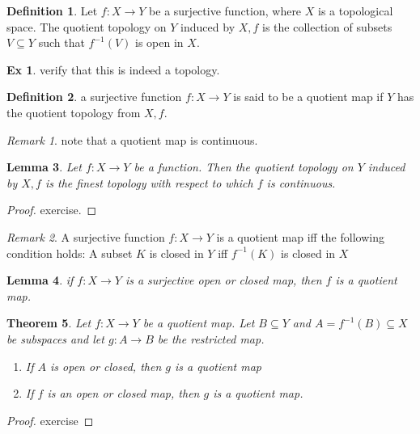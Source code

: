 \documentclass[10pt, openany]{book}
\theoremstyle{plain}
\newtheorem{theorem}{Theorem}[section]
\newtheorem{lemma}[theorem]{Lemma}
\theoremstyle{definition}
\newtheorem{definition}[theorem]{Definition}
\newtheorem{exercise}{Ex}[section]
\theoremstyle{remark}
\newtheorem{remark}{Remark}
\begin{document}
\begin{definition}
  Let $f:X\rightarrow Y$ be a surjective function, where $X$ is a topological space. The quotient topology on $Y$ induced by $X,f$ is the collection of subsets $V\subseteq Y$ such that $f^{-1}(V)$ is open in $X$.
\end{definition}
\begin{exercise}
    verify that this is indeed a topology.
\end{exercise}
\begin{definition}
    a surjective function $f: X\rightarrow Y$ is said to be a quotient map if $Y$ has the quotient topology from $X,f$.
\end{definition}
\begin{remark}
    note that a quotient map is continuous.
\end{remark}

\begin{lemma}
    Let $f:X\rightarrow Y$ be a function. Then the quotient topology on $Y$ induced by $X,f$ is the finest topology with respect to which $f$ is continuous.
\end{lemma}
\begin{proof}
    exercise.
\end{proof}
\begin{remark}
    A surjective function $f:X\rightarrow Y$ is a quotient map iff the following condition holds:\newline
    A subset $K$ is closed in $Y$ iff $f^{-1}(K)$ is closed in $X$
\end{remark}

\begin{lemma}
    if $f:X\rightarrow Y$ is a surjective open or closed map, then $f$ is a quotient map.
\end{lemma}

\begin{theorem}
    Let $f:X\rightarrow Y$ be a quotient map. Let $B\subseteq Y$ and $A=f^{-1}(B)\subseteq X$ be subspaces and let $g : A\rightarrow B$ be the restricted map.
    \begin{enumerate}
    \item If $A$ is open or closed, then $g$ is a quotient map
    \item If $f$ is an open or closed map, then $g$ is a quotient map.
\end{enumerate}
\end{theorem}
\begin{proof}
    exercise
\end{proof}
\end{document}
